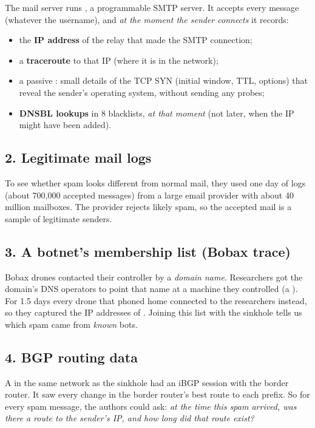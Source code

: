 The mail server runs , a programmable SMTP server. It accepts every message (whatever the username), and \emph{at the moment
the sender connects} it records:
\begin{itemize}
  \item the \textbf{IP address} of the relay that made the SMTP connection;
  \item a \textbf{traceroute} to that IP (where it is in the network);
  \item a passive : small details of the TCP SYN (initial window, TTL, options) that reveal the sender's operating
        system, without sending any probes;
  \item \textbf{DNSBL lookups} in 8 blacklists, \emph{at that moment} (not later, when the IP might have been added).
\end{itemize}

\subsection{2. Legitimate mail logs}
To see whether spam looks different from normal mail, they used one day of logs (about 700,000 accepted messages) from a large email provider
with about 40 million mailboxes. The provider rejects likely spam, so the accepted mail is a sample of legitimate senders.

\subsection{3. A botnet's membership list (Bobax trace)}
Bobax drones contacted their controller by a \emph{domain name}. Researchers got the domain's DNS operators to point that name at a machine they
controlled (a ). For 1.5 days every drone that phoned home connected to the researchers instead, so they captured the IP
addresses of . Joining this list with the sinkhole tells us which spam came from \emph{known} bots.

\subsection{4. BGP routing data}
A  in the same network as the sinkhole had an iBGP session with the border router. It saw every change in the border router's
best route to each prefix. So for every spam message, the authors could ask: \emph{at the time this spam arrived, was there a route to the
sender's IP, and how long did that route exist?}

